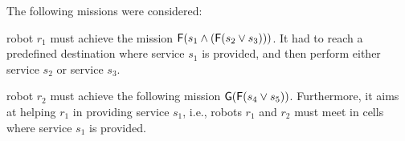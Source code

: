 The following missions were considered:
\begin{enumerate*}
	\item robot $r_1$ must achieve the mission $\mathsf{F} (s_1 \wedge (\mathsf{F} (s_2 \vee s_3) ))$. It had to reach a predefined destination where service  $s_1$ is provided, and then  perform either service $s_2$  or service $s_3$.
	\item robot $r_2$  must achieve the following mission $\mathsf{G}(\mathsf{F}(s_4 \vee s_5))$.
	Furthermore, it aims at helping $r_1$ in providing service  $s_1$, i.e., robots $r_1$ and $r_2$ must meet in cells where  service $s_1$ is provided.
\end{enumerate*}




